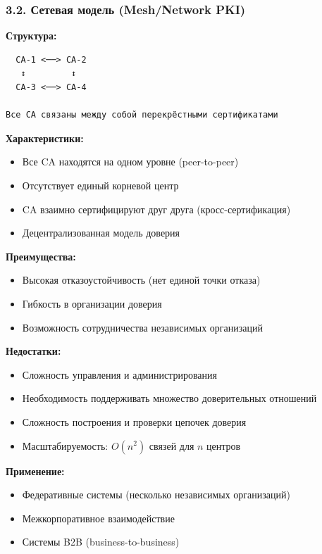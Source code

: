 \subsubsection*{3.2. Сетевая модель (Mesh/Network PKI)}

\textbf{Структура:}
\begin{verbatim}
  CA-1 <──> CA-2
   ↕         ↕
  CA-3 <──> CA-4

Все CA связаны между собой перекрёстными сертификатами
\end{verbatim}

\textbf{Характеристики:}
\begin{itemize}
    \item Все CA находятся на одном уровне (peer-to-peer)
    \item Отсутствует единый корневой центр
    \item CA взаимно сертифицируют друг друга (кросс-сертификация)
    \item Децентрализованная модель доверия
\end{itemize}

\textbf{Преимущества:}
\begin{itemize}
    \item Высокая отказоустойчивость (нет единой точки отказа)
    \item Гибкость в организации доверия
    \item Возможность сотрудничества независимых организаций
\end{itemize}

\textbf{Недостатки:}
\begin{itemize}
    \item Сложность управления и администрирования
    \item Необходимость поддерживать множество доверительных отношений
    \item Сложность построения и проверки цепочек доверия
    \item Масштабируемость: $O(n^2)$ связей для $n$ центров
\end{itemize}

\textbf{Применение:}
\begin{itemize}
    \item Федеративные системы (несколько независимых организаций)
    \item Межкорпоративное взаимодействие
    \item Системы B2B (business-to-business)
\end{itemize}

